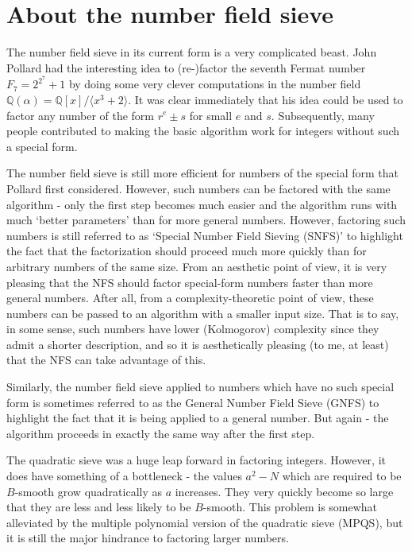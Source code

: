 \documentclass[12pt]{article}
\newcommand{\Q}{\mathbb{Q}}
\newcommand{\ideal}[1]{{\langle #1 \rangle}}
\begin{document}
\section{About the number field sieve} \label{sec:aboutnfs}

  The number field sieve in its current form is a very complicated beast.
  John Pollard had the interesting idea to (re-)factor the seventh
  Fermat number $F_7=2^{2^7} + 1$ by doing some very clever computations
  in the number field $\Q(\alpha) = \Q[x]/\ideal{x^3+2}$. It was clear
  immediately that his idea could be used to factor any number
  of the form $r^e \pm s$ for small $e$ and $s$. Subsequently, many
  people contributed to making the basic algorithm work for integers
  without such a special form. 

  The number field sieve is still more efficient for numbers of the 
  special form that Pollard first considered. However, such numbers
  can be factored with the same algorithm - only the first step becomes
  much easier and the algorithm runs with much `better parameters' than
  for more general numbers. However, factoring such numbers is still
  referred to as `Special Number Field Sieving (SNFS)' to highlight the
  fact that the factorization should proceed much more quickly than for
  arbitrary numbers of the same size. From an aesthetic point of view, it
  is very pleasing that the NFS should factor special-form numbers faster
  than more general numbers. After all, from a complexity-theoretic point
  of view, these numbers can be passed to an algorithm with a smaller
  input size. That is to say, in some sense, such numbers have lower
  (Kolmogorov) complexity since they admit a shorter description, and so
  it is aesthetically pleasing (to me, at least) that the NFS can take
  advantage of this.

  Similarly, the number field sieve applied to numbers which have no
  such special form is sometimes referred to as the General Number Field
  Sieve (GNFS) to highlight the fact that it is being applied to a
  general number. But again - the algorithm proceeds in exactly the same
  way after the first step.

  The quadratic sieve was a huge leap forward in factoring integers. 
  However, it does have something of a bottleneck - the values 
  $a^2 -N$ which are required to be $B$-smooth grow quadratically
  as $a$ increases. They very quickly become so large that they are
  less and less likely to be $B$-smooth. This problem is somewhat
  alleviated by the multiple polynomial version of the quadratic sieve
  (MPQS), but it is still the major hindrance to factoring larger
  numbers.
\end{document}
